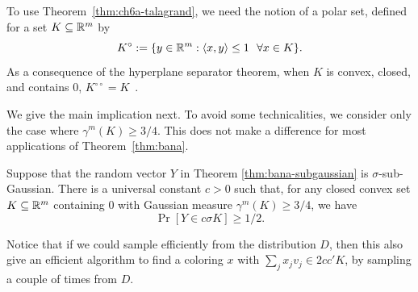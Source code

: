 To use Theorem~\ref{thm:ch6a-talagrand}, we need the notion of a polar set, defined for a set $K
\subseteq \mathbb{R}^m$ by
\[
  K^\circ := \{y \in \mathbb{R}^m: \langle x,y\rangle \le 1 \,\,\,\, \forall x \in K\}.
\]
As a consequence of the hyperplane separator theorem, when $K$ is convex, closed, and
contains $0$, $K^{\circ \circ} = K$~\cite[Chapter 5]{Matousek-discgeom}. 

We give the main implication next. To avoid some technicalities, we
consider only the case where $\gamma^m(K)\geq 3/4$. This does not make
a difference for most applications of Theorem~\ref{thm:bana}.


\begin{theorem}\label{thm:bana-subg-suff}
Suppose that the  random vector $Y$ in Theorem \ref{thm:bana-subgaussian}  is $\sigma$-sub-Gaussian.
There is a universal constant $c > 0$ such that, for any closed convex
set $K \subseteq \mathbb{R}^m$ containing $0$ with Gaussian measure $\gamma^m(K) \geq 3/4$, we have 
\[\Pr[ Y \in c\sigma K] \geq 1/2.\]
\end{theorem}
\begin{remark}
    Notice that if we could sample efficiently from the distribution $D$, then this also give an efficient algorithm to find a coloring $x$ with $\sum_j x_j v_j \in 2cc'K$, by sampling a couple of times from $D$.
\end{remark}
